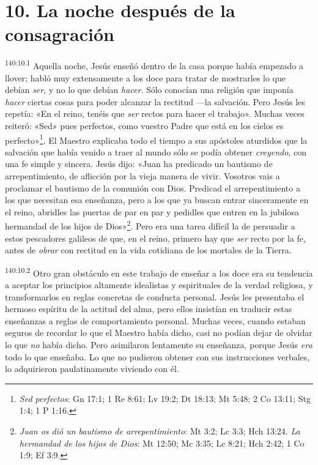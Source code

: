 \section*{10. La noche después de la consagración}
\par
\textsuperscript{140:10.1} Aquella noche, Jesús enseñó dentro de la casa porque había empezado a llover; habló muy extensamente a los doce para tratar de mostrarles lo que debían \textit{ser}, y no lo que debían \textit{hacer}. Sólo conocían una religión que imponía \textit{hacer} ciertas cosas para poder alcanzar la rectitud ---la salvación. Pero Jesús les repetía: «En el reino, tenéis que \textit{ser} rectos para hacer el trabajo». Muchas veces reiteró: «Sed» pues perfectos, como vuestro Padre que está en los cielos es perfecto»\footnote{\textit{Sed perfectos}: Gn 17:1; 1 Re 8:61; Lv 19:2; Dt 18:13; Mt 5:48; 2 Co 13:11; Stg 1:4; 1 P 1:16.}. El Maestro explicaba todo el tiempo a sus apóstoles aturdidos que la salvación que había venido a traer al mundo sólo se podía obtener \textit{creyendo}, con una fe simple y sincera. Jesús dijo: «Juan ha predicado un bautismo de arrepentimiento, de aflicción por la vieja manera de vivir. Vosotros vais a proclamar el bautismo de la comunión con Dios. Predicad el arrepentimiento a los que necesitan esa enseñanza, pero a los que ya buscan entrar sinceramente en el reino, abridles las puertas de par en par y pedidles que entren en la jubilosa hermandad de los hijos de Dios»\footnote{\textit{Juan os dió un bautismo de arrepentimiento}: Mt 3:2; Lc 3:3; Hch 13:24. \textit{La hermandad de los hijos de Dios}: Mt 12:50; Mc 3:35; Lc 8:21; Hch 2:42; 1 Co 1:9; Ef 3:9.}. Pero era una tarea difícil la de persuadir a estos pescadores galileos de que, en el reino, primero hay que \textit{ser} recto por la fe, antes de \textit{obrar} con rectitud en la vida cotidiana de los mortales de la Tierra.

\par
\textsuperscript{140:10.2} Otro gran obstáculo en este trabajo de enseñar a los doce era su tendencia a aceptar los principios altamente idealistas y espirituales de la verdad religiosa, y transformarlos en reglas concretas de conducta personal. Jesús les presentaba el hermoso espíritu de la actitud del alma, pero ellos insistían en traducir estas enseñanzas a reglas de comportamiento personal. Muchas veces, cuando estaban seguros de recordar lo que el Maestro había dicho, casi no podían dejar de olvidar lo que \textit{no} había dicho. Pero asimilaron lentamente su enseñanza, porque Jesús \textit{era} todo lo que enseñaba. Lo que no pudieron obtener con sus instrucciones verbales, lo adquirieron paulatinamente viviendo con él.

